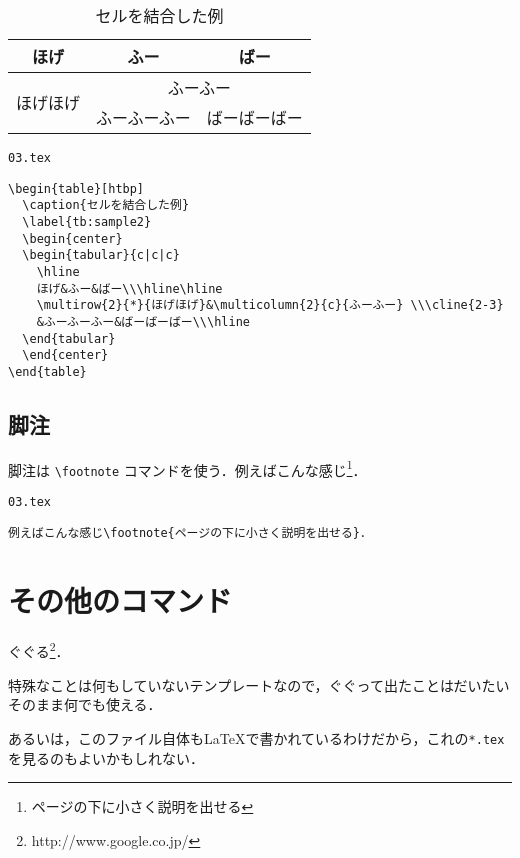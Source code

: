 \begin{table}[htbp]
  \caption{セルを結合した例}
  \label{tb:sample2}
  \begin{center}
  \begin{tabular}{c|c|c}
    \hline
    ほげ&ふー&ばー\\\hline\hline
    \multirow{2}{*}{ほげほげ}&\multicolumn{2}{c}{ふーふー} \\\cline{2-3}
    &ふーふーふー&ばーばーばー\\\hline
  \end{tabular}
  \end{center}
\end{table}

\begin{itembox}[l]{\texttt{03.tex}}
\begin{verbatim}
\begin{table}[htbp]
  \caption{セルを結合した例}
  \label{tb:sample2}
  \begin{center}
  \begin{tabular}{c|c|c}
    \hline
    ほげ&ふー&ばー\\\hline\hline
    \multirow{2}{*}{ほげほげ}&\multicolumn{2}{c}{ふーふー} \\\cline{2-3}
    &ふーふーふー&ばーばーばー\\\hline
  \end{tabular}
  \end{center}
\end{table}
\end{verbatim}
\end{itembox}


\subsection{脚注}

脚注は \verb|\footnote| コマンドを使う．例えばこんな感じ\footnote{ページの下に小さく説明を出せる}．

\begin{itembox}[l]{\texttt{03.tex}}
\begin{verbatim}
例えばこんな感じ\footnote{ページの下に小さく説明を出せる}．
\end{verbatim}
\end{itembox}

\section{その他のコマンド}

ぐぐる\footnote{http://www.google.co.jp/}．

特殊なことは何もしていないテンプレートなので，ぐぐって出たことはだいたいそのまま何でも使える．

あるいは，このファイル自体も\LaTeX で書かれているわけだから，これの\texttt{*.tex}を見るのもよいかもしれない．
